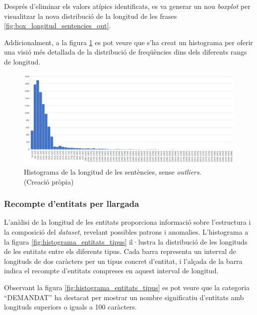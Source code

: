 Després d'eliminar els valors atípics identificats, es va generar un nou \textit{boxplot} per visualitzar la nova distribució de la longitud de les frases \ref{fig:box_longitud_sentencies_out}. 

Addicionalment, a la figura \ref{fig:histograma_sentencies_out} es pot veure que s'ha creat un histograma per oferir una visió més detallada de la distribució de freqüències dins dels diferents rangs de longitud.

\begin{figure}[H]
  \centering
  \includegraphics[width=\textwidth]{hist_sent_out.png}
  \caption[Histograma de la longitud de les sentències]{Histograma de la longitud de les sentències, sense \textit{outliers}. \\ (Creació pròpia)}
  \label{fig:histograma_sentencies_out}
\end{figure}


\subsubsection{Recompte d'entitats per llargada}
L'anàlisi de la longitud de les entitats proporciona informació sobre l'estructura i la composició del \textit{dataset}, revelant possibles patrons i anomalies. L'histograma a la figura \ref{fig:histograma_entitats_tipus} il·lustra la distribució de les longituds de les entitats entre els diferents tipus. Cada barra representa un interval de longituds de dos caràcters per un tipus concret d'entitat, i l'alçada de la barra indica el recompte d'entitats compreses en aquest interval de longitud.

Observant la figura \ref{fig:histograma_entitats_tipus} es pot veure que la categoria ``DEMANDAT'' ha destacat per mostrar un nombre significatiu d'entitats amb longituds superiors o iguals a 100 caràcters.

